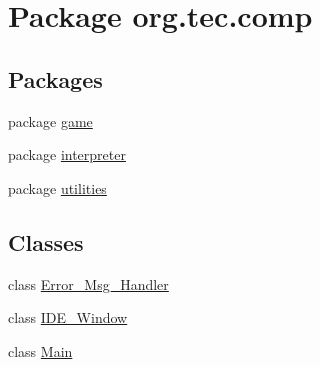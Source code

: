 \hypertarget{namespaceorg_1_1tec_1_1comp}{}\section{Package org.\+tec.\+comp}
\label{namespaceorg_1_1tec_1_1comp}
\subsection*{Packages}
\begin{DoxyCompactItemize}
\item 
package \mbox{\hyperlink{namespaceorg_1_1tec_1_1comp_1_1game}{game}}
\item 
package \mbox{\hyperlink{namespaceorg_1_1tec_1_1comp_1_1interpreter}{interpreter}}
\item 
package \mbox{\hyperlink{namespaceorg_1_1tec_1_1comp_1_1utilities}{utilities}}
\end{DoxyCompactItemize}
\subsection*{Classes}
\begin{DoxyCompactItemize}
\item 
class \mbox{\hyperlink{classorg_1_1tec_1_1comp_1_1_error___msg___handler}{Error\+\_\+\+Msg\+\_\+\+Handler}}
\item 
class \mbox{\hyperlink{classorg_1_1tec_1_1comp_1_1_i_d_e___window}{I\+D\+E\+\_\+\+Window}}
\item 
class \mbox{\hyperlink{classorg_1_1tec_1_1comp_1_1_main}{Main}}
\end{DoxyCompactItemize}

